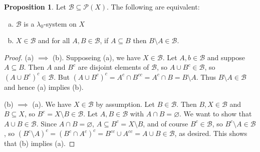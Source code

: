 \documentclass{article}
\theoremstyle{definition}
\newtheorem{proposition}[theorem]{Proposition}
\begin{document}
\begin{proposition}
    Let $\mathscr{B} \subseteq \mathcal{P}(X)$. The following are equivalent:
    \begin{enumerate}[(a)]
        \item $\mathscr{B}$ is a $\lambda_0$-system on $X$
        \item $X \in \mathscr{B}$ and for all $A, B \in \mathscr{B}$, if $A \subseteq B$ then $B \setminus A \in \mathscr{B}$.
    \end{enumerate}
\end{proposition}
\begin{proof}
    (a) $\implies$ (b). Supposeing (a), we have $X \in \mathscr{B}$. Let $A, b \in \mathscr{B}$ and suppose $A \subseteq B$. Then $A$ and $B^c$ are disjoint elements of $\mathscr{B}$, so $A \cup B^c \in \mathscr{B}$, so $(A \cup B^c)^c \in \mathscr{B}$.
    But $(A \cup B^c)^c = A^c \cap B^{cc} = A^c \cap B = B \setminus A$. Thus $B \setminus A \in \mathscr{B}$ and hence (a) implies (b).
    
    (b) $\implies$ (a). We have $X \in \mathscr{B}$ by assumption. Let $B \in \mathscr{B}$. Then $B, X \in \mathscr{B}$ and $B \subseteq X$, so $B^c = X \setminus B \in \mathscr{B}$.
    Let $A, B \in \mathscr{B}$ with $A \cap B = \varnothing$. We want to show that $A \cup B \in \mathscr{B}$. Since  $A \cap B = \varnothing$, $A \subseteq B^c = X \setminus B$, and of course $B^c \in \mathscr{B}$, so $B^c \setminus A \in \mathscr{B}$, so $(B^c \setminus A)^c = (B^c \cap A^c)^c = B^{cc} \cup A^{cc} = A \cup B \in \mathscr{B}$, as desired. This shows that (b) implies (a).
\end{proof}
\end{document}
